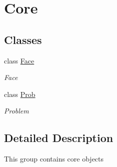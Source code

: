 \hypertarget{group__group__core}{
\section{Core}
\label{group__group__core}
}
\subsection*{Classes}
\begin{DoxyCompactItemize}
\item 
class \hyperlink{classFace}{Face}
\begin{DoxyCompactList}\small\item\em Face \item\end{DoxyCompactList}\item 
class \hyperlink{classProb}{Prob}
\begin{DoxyCompactList}\small\item\em Problem \item\end{DoxyCompactList}\end{DoxyCompactItemize}


\subsection{Detailed Description}
This group contains core objects 
